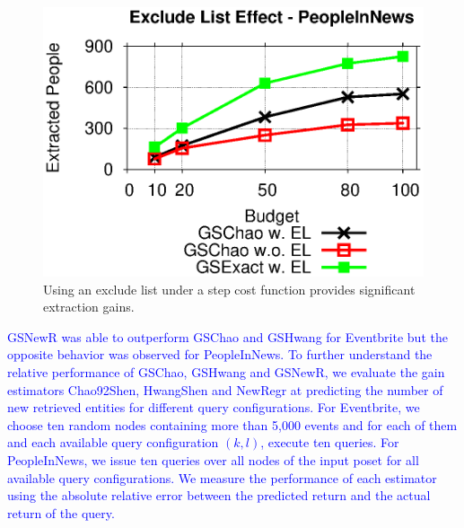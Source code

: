 \begin{figure}[h]
	\begin{center}
	\includegraphics[clip,scale=0.5]{figs/exEffect.eps}
	\caption{Using an exclude list under a step cost function provides significant extraction gains.}
	\label{fig:exEffect}
	\end{center}
	\vspace{-10pt}
\end{figure}

\textcolor{blue}{
GSNewR was able to outperform GSChao and GSHwang for Eventbrite but the opposite behavior was observed for PeopleInNews. To further understand the relative performance of GSChao, GSHwang and GSNewR, we evaluate the gain estimators Chao92Shen, HwangShen and NewRegr at predicting the number of new retrieved entities for different query configurations. For Eventbrite, we choose ten random nodes containing more than 5,000 events and for each of them and each available query configuration $(k,l)$, execute ten queries. For PeopleInNews, we issue ten queries over all nodes of the input poset for all available query configurations.  We measure the performance of each estimator using the absolute relative error between the predicted return and the actual return of the query. }

